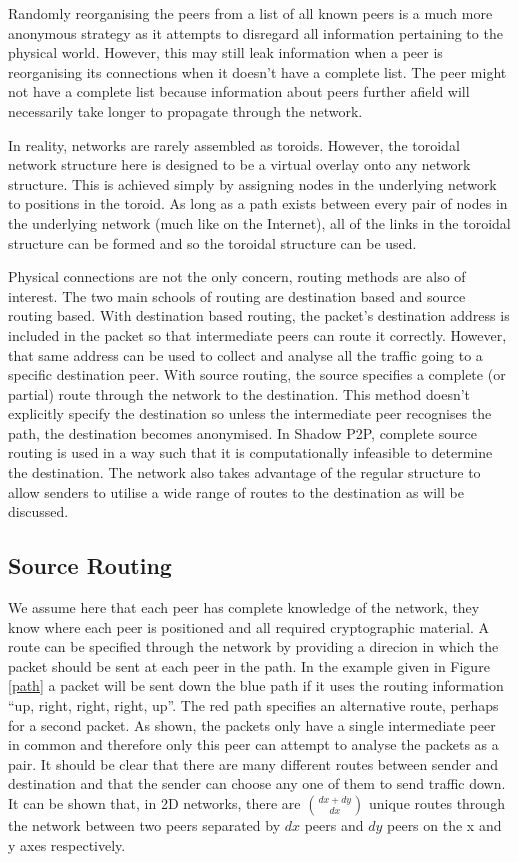 \documentclass[ %
                    author={Luke Murray},
                supervisor={Dr. Simon Hollis},
                     title={Shadow Peer-to-Peer Networks},
                  subtitle={},
                    degree={MEng},
                      year={2013} ]{thesis}
\begin{document}
Randomly reorganising the peers from a list of all known peers is a much more anonymous strategy as it attempts to disregard all information pertaining to the physical world. However, this may still leak information when a peer is reorganising its connections when it doesn't have a complete list. The peer might not have a complete list because information about peers further afield will necessarily take longer to propagate through the network.

In reality, networks are rarely assembled as toroids. However, the toroidal network structure here is designed to be a virtual overlay onto any network structure. This is achieved simply by assigning nodes in the underlying network to positions in the toroid. As long as a path exists between every pair of nodes in the underlying network (much like on the Internet), all of the links in the toroidal structure can be formed and so the toroidal structure can be used.

Physical connections are not the only concern, routing methods are also of interest. The two main schools of routing are destination based and source routing based. With destination based routing, the packet's destination address is included in the packet so that intermediate peers can route it correctly. However, that same address can be used to collect and analyse all the traffic going to a specific destination peer. With source routing, the source specifies a complete (or partial) route through the network to the destination. This method doesn't explicitly specify the destination so unless the intermediate peer recognises the path, the destination becomes anonymised. In Shadow P2P, complete source routing is used in a way such that it is computationally infeasible to determine the destination. The network also takes advantage of the regular structure to allow senders to utilise a wide range of routes to the destination as will be discussed.

\subsection{Source Routing}

We assume here that each peer has complete knowledge of the network, they know where each peer is positioned and all required cryptographic material. A route can be specified through the network by providing a direcion in which the packet should be sent at each peer in the path. In the example given in Figure \ref{path} a packet will be sent down the blue path if it uses the routing information ``up, right, right, right, up''. The red path specifies an alternative route, perhaps for a second packet. As shown, the packets only have a single intermediate peer in common and therefore only this peer can attempt to analyse the packets as a pair. It should be clear that there are many different routes between sender and destination and that the sender can choose any one of them to send traffic down. It can be shown that, in 2D networks, there are ${dx + dy \choose dx}$ unique routes through the network between two peers separated by $dx$ peers and $dy$ peers on the x and y axes respectively.
\end{document}
